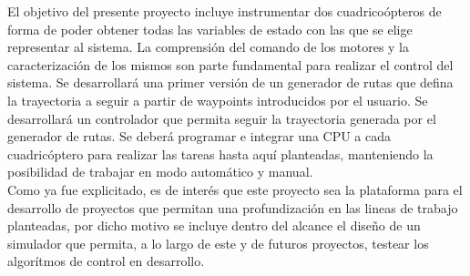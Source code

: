 \documentclass[main]{subfiles}
\begin{document}
El objetivo del presente proyecto incluye instrumentar dos cuadrico\'opteros de forma de poder obtener todas las variables de estado con las que se elige representar al sistema. La comprensi\'on del comando de los motores y la caracterizaci\'on de los mismos son parte fundamental para realizar el control del sistema. Se desarrollar\'a una primer versi\'on de un generador de rutas que defina la trayectoria a seguir a partir de waypoints introducidos por el usuario. Se desarrollar\'a un controlador que permita seguir la trayectoria generada por el generador de rutas. Se deber\'a programar e integrar una CPU a cada cuadric\'optero para realizar las tareas hasta aqu\'i planteadas, manteniendo la posibilidad de trabajar en modo autom\'atico y manual.\\

Como ya fue explicitado, es de inter\'es que este proyecto sea la plataforma para el desarrollo de proyectos que permitan una profundizaci\'on en las lineas de trabajo planteadas, por dicho motivo se incluye dentro del alcance el diseño de un simulador que permita, a lo largo de este y de futuros proyectos, testear los algor\'itmos de control en desarrollo.
\end{document}

